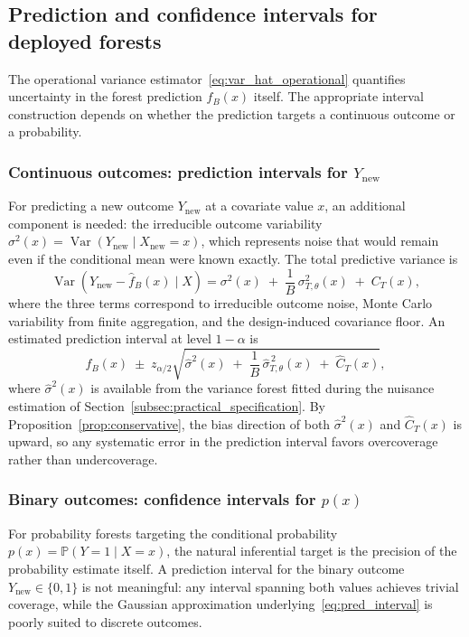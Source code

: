 \documentclass[11pt]{article}
\theoremstyle{plain}
\theoremstyle{definition}
\theoremstyle{remark}
\DeclareMathOperator{\Var}{Var}
\begin{document}
\subsection{Prediction and confidence intervals for deployed forests}
\label{subsec:prediction_intervals}

The operational variance estimator~\eqref{eq:var_hat_operational} quantifies uncertainty in the forest prediction $\hat f_B(x)$ itself. The appropriate interval construction depends on whether the prediction targets a continuous outcome or a probability.

\subsubsection*{Continuous outcomes: prediction intervals for $Y_{\mathrm{new}}$}

For predicting a new outcome $Y_{\mathrm{new}}$ at a covariate value $x$, an additional component is needed: the irreducible outcome variability $\sigma^2(x) = \Var(Y_{\mathrm{new}} \mid X_{\mathrm{new}} = x)$, which represents noise that would remain even if the conditional mean were known exactly. The total predictive variance is
\[
\Var\!\left(Y_{\mathrm{new}} - \hat f_B(x) \mid X\right)
=
\sigma^2(x)
\;+\;
\frac{1}{B}\,\sigma_{T,\theta}^2(x)
\;+\;
C_T(x),
\]
where the three terms correspond to irreducible outcome noise, Monte Carlo variability from finite aggregation, and the design-induced covariance floor. An estimated prediction interval at level $1-\alpha$ is
\begin{equation}
	\label{eq:pred_interval}
	\hat f_B(x)
	\;\pm\;
	z_{\alpha/2}
	\sqrt{
		\hat\sigma^2(x)
		\;+\;
		\frac{1}{B}\,\widehat\sigma_{T,\theta}^{\,2}(x)
		\;+\;
		\widehat C_T(x)
	},
\end{equation}
where $\hat\sigma^2(x)$ is available from the variance forest fitted during the nuisance estimation of Section~\ref{subsec:practical_specification}. By Proposition~\ref{prop:conservative}, the bias direction of both $\hat\sigma^2(x)$ and $\widehat C_T(x)$ is upward, so any systematic error in the prediction interval favors overcoverage rather than undercoverage.

\subsubsection*{Binary outcomes: confidence intervals for $p(x)$}

For probability forests targeting the conditional probability $p(x) = \mathbb P(Y = 1 \mid X = x)$, the natural inferential target is the precision of the probability estimate itself. A prediction interval for the binary outcome $Y_{\mathrm{new}} \in \{0,1\}$ is not meaningful: any interval spanning both values achieves trivial coverage, while the Gaussian approximation underlying~\eqref{eq:pred_interval} is poorly suited to discrete outcomes.
\end{document}
